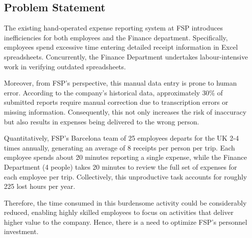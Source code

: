 \subsection{Problem Statement}
\label{sec:problems-to-solve}

The existing hand-operated expense reporting system at FSP introduces inefficiencies for both employees and the Finance department. Specifically, employees spend excessive time entering detailed receipt information in Excel spreadsheets. Concurrently, the Finance Department undertakes labour-intensive work in verifying outdated spreadsheets.

Moreover, from FSP's perspective, this manual data entry is prone to human error. According to the company's historical data, approximately 30\% of submitted reports require manual correction due to transcription errors or missing information. Consequently, this not only increases the risk of inaccuracy but also results in expenses being delivered to the wrong person. 

Quantitatively, FSP's Barcelona team of 25 employees departs for the UK 2-4 times annually, generating an average of 8 receipts per person per trip. Each employee spends about 20 minutes reporting a single expense, while the Finance Department (4 people) takes 20 minutes to review the full set of expenses for each employee per trip. Collectively, this unproductive task accounts for roughly 225 lost hours per year. 

Therefore, the time consumed in this burdensome activity could be considerably reduced, enabling highly skilled employees to focus on activities that deliver higher value to the company. Hence, there is a need to optimize FSP's personnel investment.

